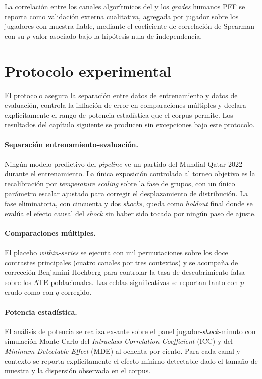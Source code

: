 La correlación entre los canales algorítmicos del \CCV y los
\textit{grades} humanos PFF se reporta como validación externa
cualitativa, agregada por jugador sobre los jugadores con muestra
fiable, mediante el coeficiente de correlación de Spearman con su
$p$-valor asociado bajo la hipótesis nula de independencia.


\section{Protocolo experimental}
\label{sec:protocolo}

El protocolo asegura la separación entre datos de entrenamiento y
datos de evaluación, controla la inflación de error en comparaciones
múltiples y declara explícitamente el rango de potencia estadística
que el corpus permite. Los resultados del capítulo siguiente se
producen sin excepciones bajo este protocolo.

\paragraph{Separación entrenamiento-evaluación.}
Ningún modelo predictivo del \textit{pipeline} ve un partido del
Mundial Qatar 2022 durante el entrenamiento. La única exposición
controlada al torneo objetivo es la recalibración por
\textit{temperature scaling} sobre la fase de grupos, con un único
parámetro escalar ajustado para corregir el desplazamiento de
distribución. La fase eliminatoria, con cincuenta y dos
\textit{shocks}, queda como \textit{holdout} final donde se evalúa
el efecto causal del \textit{shock} sin haber sido tocada por
ningún paso de ajuste.

\paragraph{Comparaciones múltiples.}
El placebo \textit{within-series} se ejecuta con mil permutaciones
sobre los doce contrastes principales (cuatro canales por tres
contextos) y se acompaña de corrección Benjamini-Hochberg para
controlar la tasa de descubrimiento falsa sobre los ATE poblacionales.
Las celdas significativas se reportan tanto con $p$ crudo como con
$q$ corregido.

\paragraph{Potencia estadística.}
El análisis de potencia se realiza ex-ante sobre el panel
jugador-\textit{shock}-minuto con simulación Monte Carlo del
\textit{Intraclass Correlation Coefficient} (ICC) y del
\textit{Minimum Detectable Effect} (MDE) al ochenta por ciento. Para
cada canal y contexto se reporta explícitamente el efecto mínimo
detectable dado el tamaño de muestra y la dispersión observada en el
corpus.

